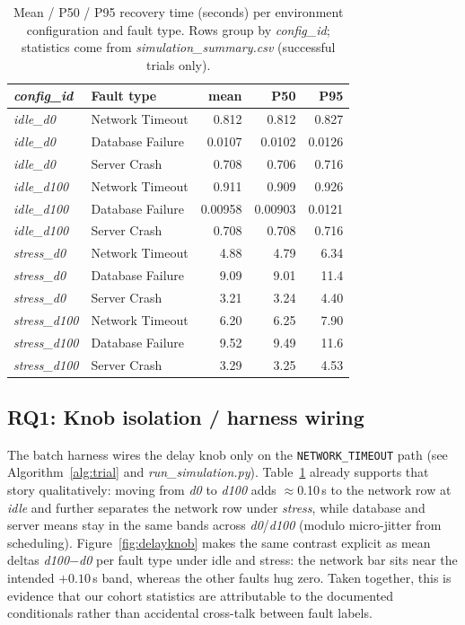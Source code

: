 \documentclass[sigconf,authorversion,nonacm]{acmart}
\begin{document}
\begin{table}[t]
  \centering
  \caption{Mean / P50 / P95 recovery time (seconds) per environment configuration and fault type. Rows group by \emph{config\_id}; statistics come from \emph{simulation\_summary.csv} (successful trials only).}
  \label{tab:grid}
  \small
  \setlength{\tabcolsep}{4pt}
  \begin{tabular}{@{}l l r r r@{}}
    \toprule
    \emph{config\_id} & Fault type & mean & P50 & P95 \\
    \midrule
    \emph{idle\_d0}   & Network Timeout   & 0.812 & 0.812 & 0.827 \\
    \emph{idle\_d0}   & Database Failure & 0.0107 & 0.0102 & 0.0126 \\
    \emph{idle\_d0}   & Server Crash      & 0.708 & 0.706 & 0.716 \\
    \emph{idle\_d100} & Network Timeout   & 0.911 & 0.909 & 0.926 \\
    \emph{idle\_d100} & Database Failure & 0.00958 & 0.00903 & 0.0121 \\
    \emph{idle\_d100} & Server Crash      & 0.708 & 0.708 & 0.716 \\
    \emph{stress\_d0} & Network Timeout   & 4.88 & 4.79 & 6.34 \\
    \emph{stress\_d0} & Database Failure & 9.09 & 9.01 & 11.4 \\
    \emph{stress\_d0} & Server Crash      & 3.21 & 3.24 & 4.40 \\
    \emph{stress\_d100} & Network Timeout   & 6.20 & 6.25 & 7.90 \\
    \emph{stress\_d100} & Database Failure & 9.52 & 9.49 & 11.6 \\
    \emph{stress\_d100} & Server Crash      & 3.29 & 3.25 & 4.53 \\
    \bottomrule
  \end{tabular}
\end{table}

\subsection{RQ1: Knob isolation / harness wiring}
The batch harness wires the delay knob only on the \texttt{NETWORK\_TIMEOUT} path (see Algorithm~\ref{alg:trial} and \emph{run\_simulation.py}). Table~\ref{tab:grid} already supports that story qualitatively: moving from \emph{d0} to \emph{d100} adds $\approx$0.10\,s to the network row at \emph{idle} and further separates the network row under \emph{stress}, while database and server means stay in the same bands across \emph{d0}/\emph{d100} (modulo micro-jitter from scheduling). Figure~\ref{fig:delayknob} makes the same contrast explicit as mean deltas \emph{d100}$-$\emph{d0} per fault type under idle and stress: the network bar sits near the intended $+0.10$\,s band, whereas the other faults hug zero. Taken together, this is evidence that our cohort statistics are attributable to the documented conditionals rather than accidental cross-talk between fault labels.
\end{document}
